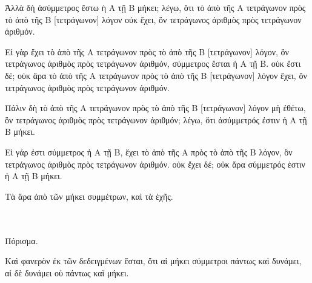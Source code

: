 \begin{Parallel}{}{}
{{\greekfont Ἀλλὰ δὴ ἀσύμμετρος ἔστω ἡ Α τῇ Β μήκει; λέγω, ὅτι τὸ
ἀπὸ τῆς Α τετράγωνον πρὸς τὸ ἀπὸ τῆς Β [τετράγωνον] λόγον
οὐκ ἔχει, ὃν τετράγωνος ἀριθμὸς πρὸς τετράγωνον ἀριθμόν.}

{\greekfont Εἰ γὰρ ἔχει τὸ ἀπὸ τῆς Α τετράγωνον πρὸς τὸ ἀπὸ τῆς Β
[τετράγωνον] λόγον, ὃν τετράγωνος ἀριθμὸς πρὸς τετράγωνον
ἀριθμόν, σύμμετρος ἔσται ἡ Α τῇ Β. οὐκ ἔστι δέ; οὐκ  ἄρα τὸ
ἀπὸ τῆς Α τετράγωνον πρὸς τὸ ἀπὸ τῆς Β [τετράγωνον] λόγον
ἔχει, ὃν τετράγωνος ἀριθμὸς πρὸς τετράγωνον ἀριθμόν.}

{\greekfont Πάλιν δὴ τὸ ἀπὸ τῆς Α τετράγωνον πρὸς τὸ ἀπὸ τῆς Β
[τετράγωνον] λόγον μὴ ἐθέτω, ὃν τετράγωνος ἀριθμὸς πρὸς
τετράγωνον ἀριθμόν; λέγω, ὅτι ἀσύμμετρός ἐστιν ἡ Α τῇ Β
μήκει.}

{\greekfont Εἰ γάρ ἐστι σύμμετρος ἡ Α τῇ Β, ἕχει τὸ ἀπὸ τῆς Α πρὸς
τὸ ἀπὸ τῆς Β λόγον, ὃν τετράγωνος ἀριθμὸς πρὸς
τετράγωνον ἀριθμόν. οὐκ ἔχει δέ; οὐκ ἄρα σύμμετρός ἐστιν
ἡ Α τῇ Β μήκει.}

{\greekfont Τὰ ἄρα ἀπὸ τῶν μήκει συμμέτρων, καὶ τὰ ἑχῆς.}\\~\\~\\

\begin{center}
{\large {\greekfont Πόρισμα}.}
\end{center}

{\greekfont Καὶ φανερὸν ἐκ τῶν δεδειγμένων ἔσται, ὅτι αἱ μήκει σύμμετροι
πάντως καὶ δυνάμει, αἱ δὲ δυνάμει οὐ πάντως καὶ μήκει.}}

\end{Parallel}
